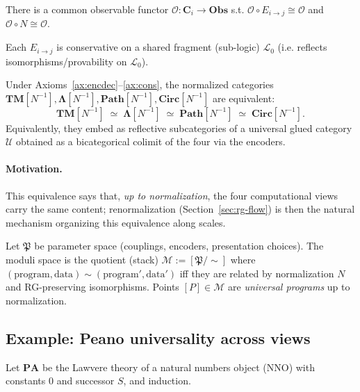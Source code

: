 \begin{axiom}
\label{ax:obs}
There is a common observable functor $\mathcal{O}:\mathbf{C}_i\to\mathbf{Obs}$ s.t.
$\mathcal{O}\circ E_{i\to j}\cong \mathcal{O}$ and $\mathcal{O}\circ N\cong \mathcal{O}$.
\end{axiom}

\begin{axiom}
\label{ax:cons}
Each $E_{i\to j}$ is conservative on a shared fragment (sub-logic) $\mathcal{L}_0$
(i.e. reflects isomorphisms/provability on $\mathcal{L}_0$).
\end{axiom}

\begin{conjecture}
\label{conj:alignment}
Under Axioms~\ref{ax:encdec}–\ref{ax:cons}, the normalized categories
$\mathbf{TM}[N^{-1}],\mathbf{\Lambda}[N^{-1}],\mathbf{Path}[N^{-1}],\mathbf{Circ}[N^{-1}]$
are equivalent:
\[
\mathbf{TM}[N^{-1}] \;\simeq\; \mathbf{\Lambda}[N^{-1}] \;\simeq\; \mathbf{Path}[N^{-1}] \;\simeq\; \mathbf{Circ}[N^{-1}].
\]
Equivalently, they embed as reflective subcategories of a universal glued category
$\mathcal{U}$ obtained as a bicategorical colimit of the four via the encoders.
\end{conjecture}

\paragraph{Motivation.}
This equivalence says that, \emph{up to normalization}, the four computational views
carry the same content; renormalization (Section~\ref{sec:rg-flow}) is then the natural
mechanism organizing this equivalence along scales.

\begin{definition}
\label{def:moduli}
Let $\mathfrak{P}$ be parameter space (couplings, encoders, presentation choices).
The moduli space is the quotient (stack) $\mathcal{M} := [\mathfrak{P} / \sim]$ where
$(\text{program},\text{data})\sim(\text{program}',\text{data}')$ iff they are related
by normalization $N$ and RG-preserving isomorphisms. Points $[P]\in\mathcal{M}$ are
\emph{universal programs} up to normalization.
\end{definition}

\subsection{Example: Peano universality across views}
\label{subsec:peano-moduli}
Let $\mathbf{PA}$ be the Lawvere theory of a natural numbers object (NNO)
with constants $0$ and successor $S$, and induction.

